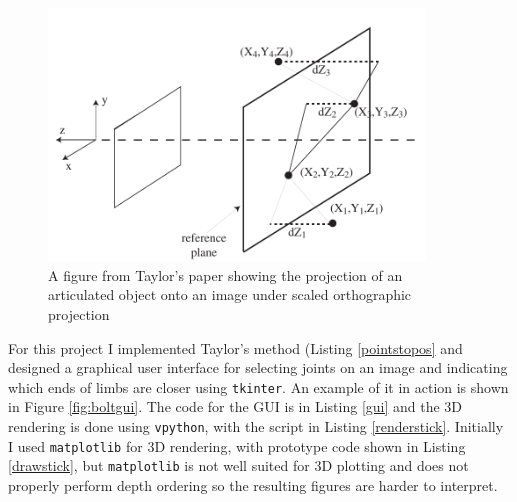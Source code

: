 \documentclass[final]{article}
\newcommand{\code}[1]{\texttt{#1}}
\begin{document}
\begin{spacing}{1.1}
\begin{figure}[h]
  \centering
  \includegraphics[width=10cm]{fig/projection2.png}
  \caption{A figure from Taylor's paper\cite{Taylor} showing the projection of an articulated object onto an image under scaled orthographic projection}
  \label{fig:unprojectmultiple}
\end{figure}

For this project I implemented Taylor's method (Listing \ref{pointstopos} and designed a graphical user interface for selecting joints on an image and indicating which ends of limbs are closer using \code{tkinter}. An example of it in action is shown in Figure \ref{fig:boltgui}. The code for the GUI is in Listing \ref{gui} and the 3D rendering is done using \code{vpython}, with the script in Listing \ref{renderstick}. Initially I used \code{matplotlib} for 3D rendering, with prototype code shown in Listing \ref{drawstick}, but \code{matplotlib} is not well suited for 3D plotting and does not properly perform depth ordering so the resulting figures are harder to interpret.


\end{spacing}
\end{document}

